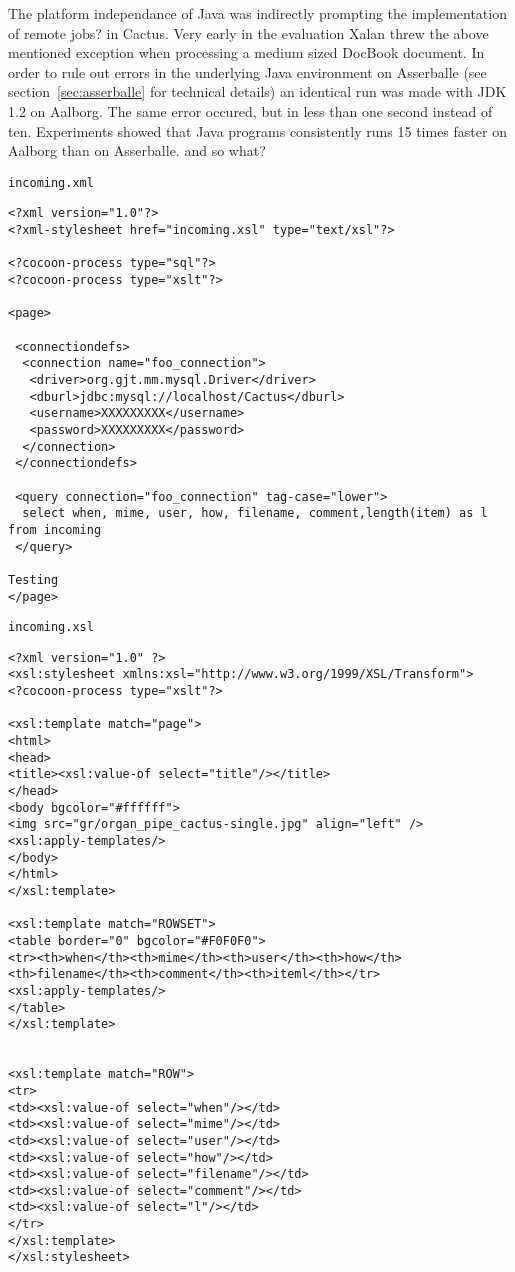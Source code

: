 The platform independance of Java was indirectly prompting the
implementation of remote \textsf{jobs?} in Cactus.  Very early in the
evaluation Xalan threw the above mentioned exception when processing a
medium sized DocBook document.  In order to rule out errors in the
underlying Java environment on Asserballe (see
section~\vref{sec:asserballe} for technical details) an identical run
was made with JDK 1.2 on Aalborg.  The same error occured, but in less
than one second instead of ten.  Experiments showed that Java programs
consistently runs 15 times faster on Aalborg than on Asserballe.
\textsf{and so what?}

\texttt{incoming.xml}
\begin{verbatim}
<?xml version="1.0"?>
<?xml-stylesheet href="incoming.xsl" type="text/xsl"?>

<?cocoon-process type="sql"?>
<?cocoon-process type="xslt"?>

<page>

 <connectiondefs>
  <connection name="foo_connection">
   <driver>org.gjt.mm.mysql.Driver</driver>
   <dburl>jdbc:mysql://localhost/Cactus</dburl>
   <username>XXXXXXXXX</username>
   <password>XXXXXXXXX</password>
  </connection>
 </connectiondefs> 
 
 <query connection="foo_connection" tag-case="lower">
  select when, mime, user, how, filename, comment,length(item) as l  from incoming
 </query>

Testing 
</page>
\end{verbatim}

\texttt{incoming.xsl}
\begin{verbatim}
<?xml version="1.0" ?>
<xsl:stylesheet xmlns:xsl="http://www.w3.org/1999/XSL/Transform">
<?cocoon-process type="xslt"?>

<xsl:template match="page">
<html>
<head>
<title><xsl:value-of select="title"/></title>
</head>
<body bgcolor="#ffffff">
<img src="gr/organ_pipe_cactus-single.jpg" align="left" />
<xsl:apply-templates/>
</body>
</html>
</xsl:template>

<xsl:template match="ROWSET">
<table border="0" bgcolor="#F0F0F0">
<tr><th>when</th><th>mime</th><th>user</th><th>how</th><th>filename</th><th>comment</th><th>iteml</th></tr>
<xsl:apply-templates/>
</table>
</xsl:template>


<xsl:template match="ROW">
<tr> 
<td><xsl:value-of select="when"/></td>
<td><xsl:value-of select="mime"/></td>
<td><xsl:value-of select="user"/></td>
<td><xsl:value-of select="how"/></td>
<td><xsl:value-of select="filename"/></td>
<td><xsl:value-of select="comment"/></td>
<td><xsl:value-of select="l"/></td>
</tr>
</xsl:template>
</xsl:stylesheet>
\end{verbatim}


